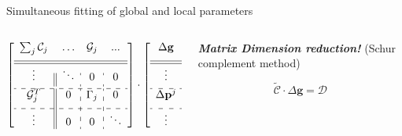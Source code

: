 \documentclass[compress, 13pt, aspectratio=169]{beamer}
\begin{document}
\begin{frame}[t,fragile]{Simultaneous fitting of global and local parameters}
\begin{columns}[t]
\begin{column}{0.45\textwidth}
			\vspace*{-0.9em}
			\setlength\extrarowheight{6pt}
			\scriptsize{
				$$ \left[  \begin{array}{c||c:c:c}
							\sum_j \mathcal{C}_j & \ldots & \mathcal{G}_j & ...    \\[6pt] \hline\hline
							\vdots               & \ddots & 0             & 0      \\[4pt] \hdashline
							\mathcal{G}^T_j      & 0      & \Gamma_j      & 0      \\[6pt] \hdashline
							\vdots               & 0      & 0             & \ddots \\
						\end{array}  \right] \cdot
					\left[ \begin{array}{c}
							\Delta \mathbf{g}   \\[6pt] \hline\hline
							\vdots              \\[4pt] \hdashline
							\Delta \mathbf{p}^j \\[6pt] \hdashline
							\vdots              \\
						\end{array} \right] =
					-\left[ \begin{array}{c}
							\partial_\mathbf{g} \mathcal{Z}     \\[6pt] \hline\hline
							\vdots                              \\[4pt] \hdashline
							\partial_{\mathbf{p}^j} \mathcal{Z} \\[6pt] \hdashline
							\vdots                              \\
						\end{array} \right]
				$$
			}

		\end{column}
		\begin{column}[t]{0.45\textwidth}
			\vspace*{-1.5em}

			\pause
			{
				\small
				\textbf{\textit{Matrix Dimension reduction!}} (Schur complement method)
				\vspace*{-0.5em}

				$$\tilde{\mathcal{C}} \cdot \Delta \mathbf{g} = \mathcal{D}$$
				\vspace*{-1.5em}

}
\end{column}
\end{columns}
\end{frame}
\end{document}
